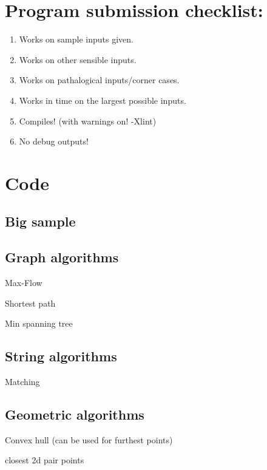 \documentclass[10pt,a4paper]{article}
\begin{document}
\maketitle
\thispagestyle{myheadings}
\section*{Program submission checklist:}
\begin{enumerate}
\item Works on sample inputs given.
\item Works on other sensible inputs.
\item Works on pathalogical inputs/corner cases.
\item Works in time on the largest possible inputs.
\item Compiles! (with warnings on! -Xlint)
\item No debug outputs!
\end{enumerate}

\section*{Code}
\subsection*{Big sample}


\subsection*{Graph algorithms}
Max-Flow

Shortest path

Min spanning tree

\subsection*{String algorithms}
Matching

\subsection{Geometric algorithms}
Convex hull (can be used for furthest points)

closest 2d pair points
\end{document}
